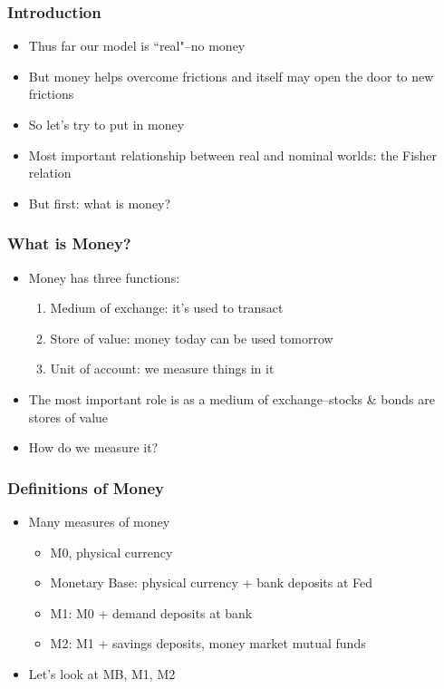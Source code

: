 \documentclass{beamer}
\author{Trevor S. Gallen}
\date{}
\begin{document}
\renewcommand*{\inserttotalframenumber}{\pageref{lastframe}}



\begin{frame}
\titlepage
\end{frame}

\begin{frame}
\frametitle[alignment=center]{Introduction}
\begin{itemize}
\item Thus far our model is ``real"--no money
\bigskip
\item But money helps overcome frictions and itself may open the door to new frictions
\bigskip
\item So let's try to put in money
\bigskip
\item Most important relationship between real and nominal worlds: the Fisher relation
\bigskip
\item But first: what is money?
\end{itemize}
\end{frame}

\begin{frame}
\frametitle[alignment=center]{What is Money?}
\begin{itemize}
\item Money has three functions:
\bigskip
\begin{enumerate}
\item Medium of exchange:  it's used to transact
\bigskip
\item Store of value: money today can be used tomorrow
\bigskip
\item Unit of account: we measure things in it
\end{enumerate}
\bigskip
\item The most important role is as a medium of exchange--stocks \& bonds are stores of value
\bigskip
\item How do we measure it?
\end{itemize}
\end{frame}

\begin{frame}
\frametitle[alignment=center]{Definitions of Money}
\begin{itemize}
\item Many measures of money
\bigskip
\begin{itemize}
\item M0, physical currency
\bigskip
\item Monetary Base: physical currency + bank deposits at Fed
\bigskip
\item M1:  M0 + demand deposits at bank
\bigskip
\item M2:  M1 + savings deposits, money market mutual funds
\end{itemize}
\bigskip
\item Let's look at MB, M1, M2
\end{itemize}
\end{frame}
\end{document}
